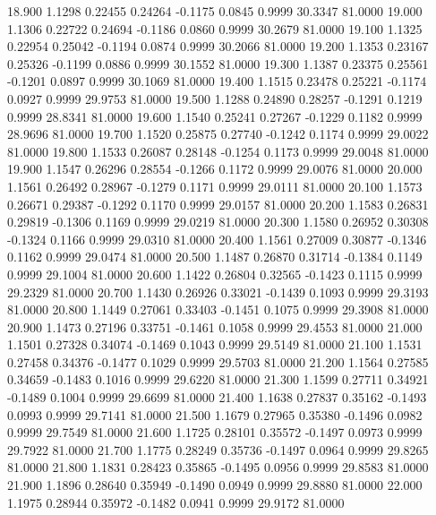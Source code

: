   18.900   1.1298   0.22455   0.24264  -0.1175   0.0845   0.9999  30.3347  81.0000
  19.000   1.1306   0.22722   0.24694  -0.1186   0.0860   0.9999  30.2679  81.0000
  19.100   1.1325   0.22954   0.25042  -0.1194   0.0874   0.9999  30.2066  81.0000
  19.200   1.1353   0.23167   0.25326  -0.1199   0.0886   0.9999  30.1552  81.0000
  19.300   1.1387   0.23375   0.25561  -0.1201   0.0897   0.9999  30.1069  81.0000
  19.400   1.1515   0.23478   0.25221  -0.1174   0.0927   0.9999  29.9753  81.0000
  19.500   1.1288   0.24890   0.28257  -0.1291   0.1219   0.9999  28.8341  81.0000
  19.600   1.1540   0.25241   0.27267  -0.1229   0.1182   0.9999  28.9696  81.0000
  19.700   1.1520   0.25875   0.27740  -0.1242   0.1174   0.9999  29.0022  81.0000
  19.800   1.1533   0.26087   0.28148  -0.1254   0.1173   0.9999  29.0048  81.0000
  19.900   1.1547   0.26296   0.28554  -0.1266   0.1172   0.9999  29.0076  81.0000
  20.000   1.1561   0.26492   0.28967  -0.1279   0.1171   0.9999  29.0111  81.0000
  20.100   1.1573   0.26671   0.29387  -0.1292   0.1170   0.9999  29.0157  81.0000
  20.200   1.1583   0.26831   0.29819  -0.1306   0.1169   0.9999  29.0219  81.0000
  20.300   1.1580   0.26952   0.30308  -0.1324   0.1166   0.9999  29.0310  81.0000
  20.400   1.1561   0.27009   0.30877  -0.1346   0.1162   0.9999  29.0474  81.0000
  20.500   1.1487   0.26870   0.31714  -0.1384   0.1149   0.9999  29.1004  81.0000
  20.600   1.1422   0.26804   0.32565  -0.1423   0.1115   0.9999  29.2329  81.0000
  20.700   1.1430   0.26926   0.33021  -0.1439   0.1093   0.9999  29.3193  81.0000
  20.800   1.1449   0.27061   0.33403  -0.1451   0.1075   0.9999  29.3908  81.0000
  20.900   1.1473   0.27196   0.33751  -0.1461   0.1058   0.9999  29.4553  81.0000
  21.000   1.1501   0.27328   0.34074  -0.1469   0.1043   0.9999  29.5149  81.0000
  21.100   1.1531   0.27458   0.34376  -0.1477   0.1029   0.9999  29.5703  81.0000
  21.200   1.1564   0.27585   0.34659  -0.1483   0.1016   0.9999  29.6220  81.0000
  21.300   1.1599   0.27711   0.34921  -0.1489   0.1004   0.9999  29.6699  81.0000
  21.400   1.1638   0.27837   0.35162  -0.1493   0.0993   0.9999  29.7141  81.0000
  21.500   1.1679   0.27965   0.35380  -0.1496   0.0982   0.9999  29.7549  81.0000
  21.600   1.1725   0.28101   0.35572  -0.1497   0.0973   0.9999  29.7922  81.0000
  21.700   1.1775   0.28249   0.35736  -0.1497   0.0964   0.9999  29.8265  81.0000
  21.800   1.1831   0.28423   0.35865  -0.1495   0.0956   0.9999  29.8583  81.0000
  21.900   1.1896   0.28640   0.35949  -0.1490   0.0949   0.9999  29.8880  81.0000
  22.000   1.1975   0.28944   0.35972  -0.1482   0.0941   0.9999  29.9172  81.0000
